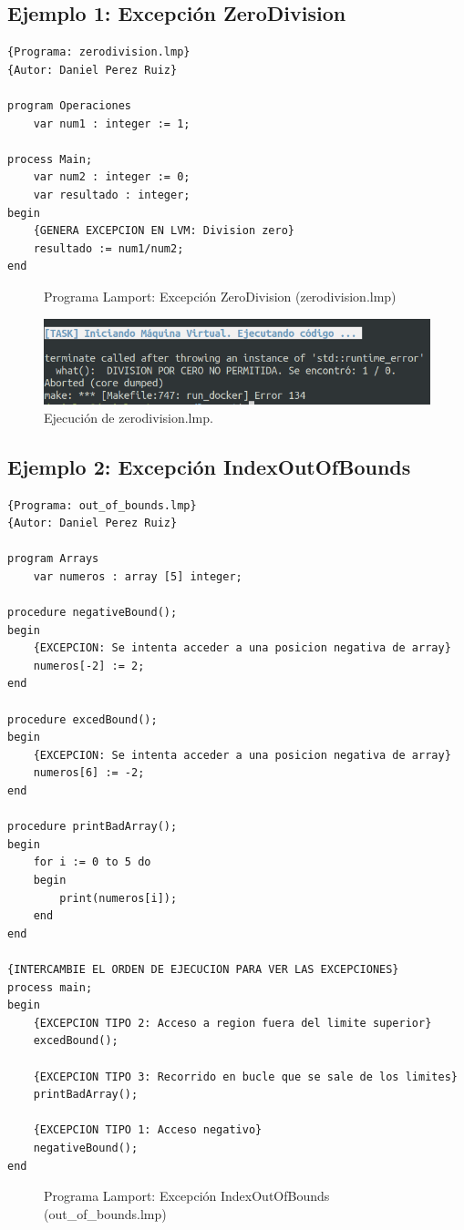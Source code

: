 \subsection{Ejemplo 1: Excepción ZeroDivision}
\begin{lstlisting}[style=lamportStyle]
{Programa: zerodivision.lmp}
{Autor: Daniel Perez Ruiz}

program Operaciones
	var num1 : integer := 1;

process Main;
	var num2 : integer := 0;
	var resultado : integer;
begin
	{GENERA EXCEPCION EN LVM: Division zero}
	resultado := num1/num2;
end
\end{lstlisting}
\begin{figure}[h]
\caption{Programa Lamport: Excepción ZeroDivision (zerodivision.lmp)}
\label{fig:lamportExceptionZeroDivision}
\end{figure}

\begin{figure}[h]
    \includegraphics[width=\linewidth]{images/ejemplos/exceptions/zerodivision.png}
    \caption{Ejecución de zerodivision.lmp.}
    \label{fig:lamportExceptionZeroDivision_exec}
\end{figure}

\newpage
\subsection{Ejemplo 2: Excepción IndexOutOfBounds}
\begin{lstlisting}[style=lamportStyle]
{Programa: out_of_bounds.lmp}
{Autor: Daniel Perez Ruiz}

program Arrays
	var numeros : array [5] integer;

procedure negativeBound();
begin
	{EXCEPCION: Se intenta acceder a una posicion negativa de array}
	numeros[-2] := 2;
end

procedure excedBound();
begin
	{EXCEPCION: Se intenta acceder a una posicion negativa de array}
	numeros[6] := -2;
end

procedure printBadArray();
begin
	for i := 0 to 5 do
	begin
		print(numeros[i]);
	end
end
	
{INTERCAMBIE EL ORDEN DE EJECUCION PARA VER LAS EXCEPCIONES}
process main;
begin
	{EXCEPCION TIPO 2: Acceso a region fuera del limite superior}
	excedBound();
	
	{EXCEPCION TIPO 3: Recorrido en bucle que se sale de los limites}
	printBadArray();

	{EXCEPCION TIPO 1: Acceso negativo}
	negativeBound();
end
\end{lstlisting}
\begin{figure}[h]
\caption{Programa Lamport: Excepción IndexOutOfBounds (out\_of\_bounds.lmp)}
\label{fig:lamportExceptionOutOfBounds}
\end{figure}


